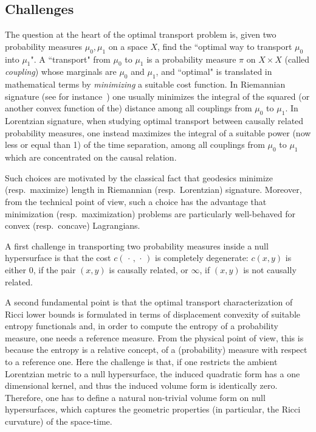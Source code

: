 \documentclass[12pt,a4paper]{amsart}
\theoremstyle{plain}
\theoremstyle{definition}
\numberwithin{equation}{section}
\newcommand{\dotargument}{\,\cdot\,}
\begin{document}
\subsection*{Challenges}
The question at the heart of the optimal transport problem is, given two probability measures $\mu_0, \mu_1$ on a space $X$, find the ``optimal way to transport $\mu_0$ into $\mu_1$". A  ``transport" from $\mu_0$ to $\mu_1$ is a probability measure $\pi$ on $X\times X$ (called \emph{coupling}) whose marginals are $\mu_0$ and $\mu_1$, and ``optimal"  is translated in mathematical terms by \emph{minimizing} a suitable cost function. In Riemannian signature (see for instance~\cite{villani:oldandnew}) one usually minimizes the integral of the squared  (or another convex function of the) distance among all couplings from $\mu_0$ to $\mu_1$.  In Lorentzian signature, when studying optimal transport between causally related probability measures, one instead maximizes the integral of a suitable power (now less or equal than 1) of the time separation, among all couplings from $\mu_0$ to $\mu_1$ which are concentrated on the causal relation.

Such choices are motivated by the classical fact that geodesics
minimize (resp.\ maximize) length in Riemannian (resp.\ Lorentzian) signature. Moreover, from the technical point of view, such a choice has the advantage that   minimization (resp.\ maximization) problems are particularly well-behaved for convex (resp.\ concave) Lagrangians.

A first challenge in transporting two probability measures inside a null hypersurface is that the cost $c(\dotargument, \dotargument)$ is completely degenerate: $c(x,y)$ is either $0$, if the pair $(x,y)$ is  causally related, or $\infty$, if $(x,y)$ is not causally related. 

A second fundamental point is that the optimal transport characterization of Ricci lower bounds is formulated in terms of displacement convexity of suitable entropy functionals and, in order to compute the entropy of a probability measure, one needs a reference measure. From the physical point of view, this is because the entropy is a relative concept, of a (probability) measure with respect to a reference one. Here the challenge is that, if one restricts the ambient Lorentzian metric to a null hypersurface, the induced quadratic form has a one dimensional kernel, and thus the induced volume form is identically zero.  Therefore, one has to define a natural non-trivial volume form on null hypersurfaces, which captures the geometric properties (in particular, the Ricci curvature) of the space-time. 
\end{document}
